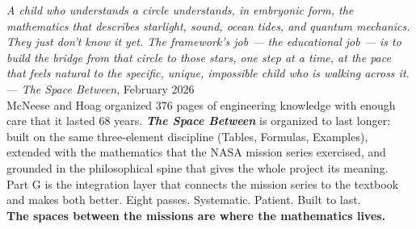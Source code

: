 \documentclass[11pt,letterpaper]{article}
\newcommand{\tspb}{\textbf{\textit{The Space Between}}}
\begin{document}
\begin{quotebox}
\textit{A child who understands a circle understands, in embryonic form, the mathematics that describes starlight, sound, ocean tides, and quantum mechanics. They just don't know it yet. The framework's job --- the educational job --- is to build the bridge from that circle to those stars, one step at a time, at the pace that feels natural to the specific, unique, impossible child who is walking across it.}\\[0.5em]
--- \textit{The Space Between}, February 2026\\[1em]
McNeese and Hoag organized 376 pages of engineering knowledge with enough care that it lasted 68 years. \tspb{} is organized to last longer: built on the same three-element discipline (Tables, Formulas, Examples), extended with the mathematics that the NASA mission series exercised, and grounded in the philosophical spine that gives the whole project its meaning. Part G is the integration layer that connects the mission series to the textbook and makes both better. Eight passes. Systematic. Patient. Built to last.\\[0.5em]
\textbf{The spaces between the missions are where the mathematics lives.}
\end{quotebox}
\end{document}
